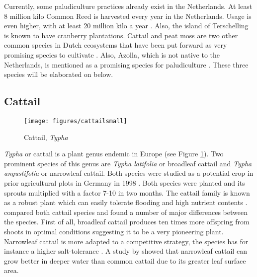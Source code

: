 \documentclass[a4paper,12pt]{scrbook}
\begin{document}
Currently, some paludiculture practices already exist in the Netherlands. At least 8 million kilo Common Reed is harvested every year in the Netherlands. Usage is even higher, with at least 20 million kilo a year \citep{wichtmann2016paludiculture}. Also, the island of Terschelling is known to have cranberry plantations. Cattail and peat moss are two other common species in Dutch ecosystems that have been put forward as very promising species to cultivate \citep{abel2013database, van2013werk}. Also, Azolla, which is not native to the Netherlands, is mentioned as a promising species for paludiculture \citep{abel2013database, van2013werk}. 
These three species will be elaborated on below.

\subsection{Cattail}

\begin{figure}
    \centering
    \texttt{[image: figures/cattailsmall]} 
    \caption{Cattail, \textit{Typha}}
    \label{fig:cattail}
\end{figure}


\textit{Typha} or cattail is a plant genus endemic in Europe (see Figure \ref{fig:cattail}). Two prominent species of this genus are \textit{Typha latifolia} or broadleaf cattail and \textit{Typha angustifolia} or narrowleaf cattail. Both species were studied as a potential crop in prior agricultural plots in Germany in 1998 \citep{wild2001cultivation}. Both species were planted and its sprouts multiplied with a factor 7-10 in two months. The cattail family is known as a robust plant which can easily tolerate flooding and high nutrient contents \citep{wild2001cultivation}. \citet{heinz2011population} compared both cattail species and found a number of major differences between the species. First of all, broadleaf cattail produces ten times more offspring from shoots in optimal conditions suggesting it to be a very pioneering plant. Narrowleaf cattail is more adapted to a competitive strategy, the species has for instance a higher salt-tolerance \citep{heinz2011population}. A study by \citet{grace1982niche} showed that narrowleaf cattail can grow better in deeper water than common cattail due to its greater leaf surface area.
\end{document}
